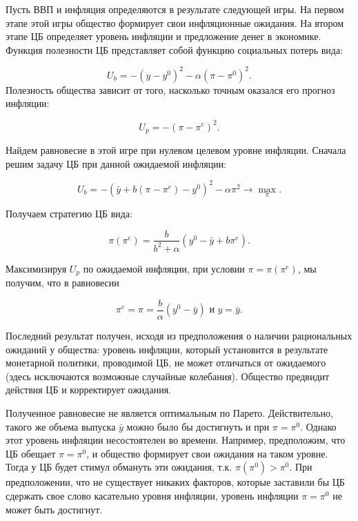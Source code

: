 \documentclass[14pt,a4paper, oneside]{extreport}
\begin{document}
Пусть ВВП и инфляция определяются в результате следующей игры. На первом этапе этой игры общество формирует свои инфляционные ожидания. На втором этапе ЦБ определяет уровень инфляции и предложение денег в экономике. 
Функция полезности ЦБ представляет собой функцию социальных потерь вида:

\begin{equation}\label{T3-2}
U_b = -(y - y^0)^2 - \alpha (\pi - \pi^0)^2.
\end{equation}
Полезность общества зависит от того, насколько точным оказался его прогноз инфляции:

\begin{equation}\label{T3-3}
U_p = -(\pi - \pi^e)^2.
\end{equation}

Найдем равновесие в этой игре при нулевом целевом уровне инфляции. Сначала решим задачу ЦБ при данной ожидаемой инфляции:

\begin{equation}\label{T3-4}
U_b = - (\bar y + b(\pi - \pi^e) - y^0)^2 - \alpha \pi^2 \to \max_\pi.
\end{equation}

Получаем стратегию ЦБ вида:

\begin{equation}\label{T3-5}
\pi(\pi^e)=\frac{b}{b^2+\alpha} (y^0- \bar y + b \pi^e).
\end{equation}

Максимизируя $U_p$ по ожидаемой инфляции, при условии  $\pi=\pi(\pi^e)$, мы получим, что в равновесии 

\begin{equation}\label{T3-6}
\pi^e = \pi = \frac{b}{\alpha} (y^0 - \bar y) \mbox{ и } y = \bar y.
\end{equation}

Последний результат получен, исходя из предположения о наличии рациональных ожиданий у общества: уровень инфляции, который установится в результате монетарной политики, проводимой ЦБ, не может отличаться от ожидаемого (здесь исключаются возможные случайные колебания). Общество предвидит действия ЦБ и корректирует ожидания. 

Полученное равновесие не является оптимальным по Парето. Действительно, такого же объема выпуска $\bar y$ можно было бы достигнуть и при $\pi=\pi^0$. Однако этот уровень инфляции несостоятелен во времени. Например, предположим, что ЦБ обещает $\pi=\pi^0$, и общество формирует свои ожидания на таком уровне. Тогда у ЦБ будет стимул обмануть эти ожидания, т.к. $\pi(\pi^0)>\pi^0$. При предположении, что не существует никаких факторов, которые заставили бы ЦБ сдержать свое слово касательно уровня инфляции, уровень инфляции $\pi=\pi^0$ не может быть достигнут.
\end{document}
